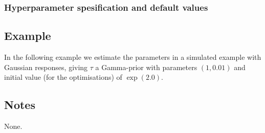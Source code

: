 \documentclass[a4paper,11pt]{article}
\begin{document}
\subsubsection*{Hyperparameter spesification and default values}




\subsection*{Example}

In the following example we estimate the parameters in a simulated
example with Gaussian responses, giving $\tau$ a Gamma-prior with
parameters $(1, 0.01)$ and initial value (for the optimisations) of
$\exp(2.0)$.


\subsection*{Notes}

None.
\end{document}
